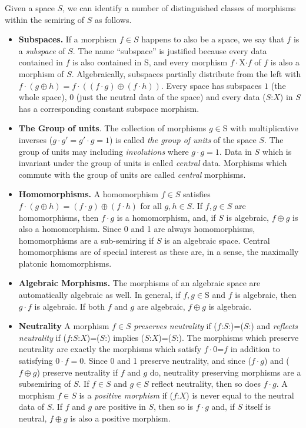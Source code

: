 \documentclass[11pt]{article}
\begin{document}
Given a space $S$, we can identify a number of distinguished classes of morphisms within the semiring of $S$ as follows.
\begin{itemize}

\item{{\bf Subspaces.} If a morphism $f\in S$ happens to also be a space, we say that $f$ is a {\it subspace} of $S$.  The name ``subspace'' is justified because every data contained in $f$ is also contained in S, and every morphism $f\cdot$X$\cdot f$ of $f$ is also a morphism of $S$.  Algebraically, subspaces partially distribute from the left with  
$f\cdot(g\oplus h)=f\cdot((f\cdot g)\oplus(f\cdot h))$.  Every space has subspaces $1$ (the whole space), $0$ (just the neutral data of the space) and every data ($S$:$X$) in $S$ has a corresponding 
constant subspace morphism.} 

\item {{\bf The Group of units}. The collection of morphisms $g\in$S with multiplicative inverses ($g\cdot g'=g'\cdot g=1$) is called {\it the group of units} of the space $S$.  
The group of units may including {\it involutions} where $g\cdot g=1$.  Data in $S$ which is invariant under the group of units is 
called {\it central} data.  Morphisms which commute with the group of units are called {\it central} morphisms.}

\item{{\bf Homomorphisms.}  A homomorphism $f\in S$ satisfies $f\cdot (g\oplus h) = (f\cdot g)\oplus (f\cdot h)$ for all $g,h\in S$.  If 
$f,g\in S$ are homomorphisms, then $f\cdot g$ is a homomorphism, and, if $S$ is algebraic, $f\oplus g$ is also a homomorphism.  Since 0 and 1 are always homomorphisms, 
homomorphisms are a sub-semiring if $S$ is an algebraic space.  Central homomorphisms are of special interest as these are, in a sense, the maximally platonic homomorphisms.}

\item {{\bf Algebraic Morphisms.} The morphisms of an algebraic space are automatically algebraic as well.  In general, if $f,g\in$S and $f$ is algebraic, then $g\cdot f$ is algebraic.  If both 
$f$ and $g$ are algebraic, $f\oplus g$ is algebraic.}

\item{{\bf Neutrality} A morphism $f\in S$ {\it preserves neutrality} if ($f$:$S$:)=($S$:) and {\it reflects neutrality} if ($f$:$S$:$X$)=($S$:) implies ($S$:$X$)=($S$:). 
The morphisms which preserve neutrality are exactly the morphisms which satisfy $f\cdot 0$=$f$ in addition to satisfying $0\cdot f=0$.  Since 0 and 1 preserve neutrality, 
and since ($f\cdot g$) and ($f\oplus g$) preserve neutrality if $f$ and $g$ do, neutrality preserving morphisms are a subsemiring of $S$.  If $f\in S$ and $g\in S$ reflect neutrality, 
then so does $f\cdot g$.  A morphism $f\in S$ is a {\it positive morphism} if ($f$:$X$) is never equal to the neutral data of $S$.  If $f$ and $g$ are positive in $S$, then so is $f\cdot g$ and, 
if $S$ itself is neutral, $f\oplus g$ is also a positive morphism.}  
\end{itemize} 
\end{document}
